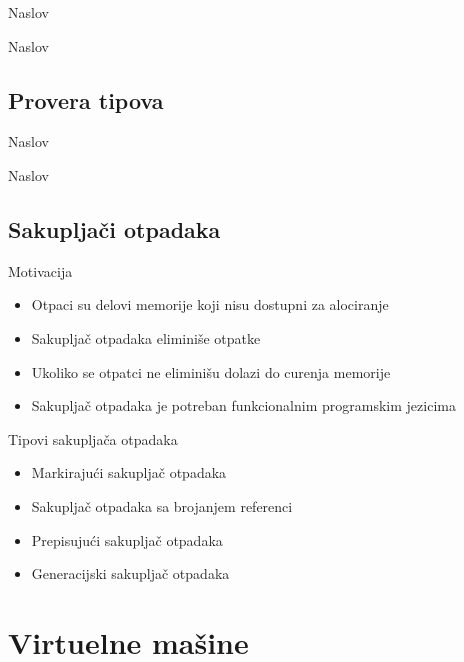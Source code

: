 \documentclass[xcolor={dvipsnames}, 11pt]{beamer}
\begin{document}
\begin{frame}{Naslov}
	
\end{frame}

\begin{frame}{Naslov}
	
\end{frame}


\subsection{Provera tipova}

\begin{frame}{Naslov}
	
\end{frame}

\begin{frame}{Naslov}
	
\end{frame}


\subsection{Sakupljači otpadaka}
\begin{frame}{Motivacija}
	\begin{itemize}
		\item Otpaci su delovi memorije koji nisu dostupni za alociranje
		\item Sakupljač otpadaka eliminiše otpatke
		\item Ukoliko se otpatci ne eliminišu dolazi do curenja memorije
		\item Sakupljač otpadaka je potreban funkcionalnim programskim jezicima
	\end{itemize}
\end{frame}

\begin{frame}{Tipovi sakupljača otpadaka}
	\begin{itemize}
		\item Markirajući sakupljač otpadaka
		\item Sakupljač otpadaka sa brojanjem referenci
		\item Prepisujući sakupljač otpadaka
		\item Generacijski sakupljač otpadaka
	\end{itemize}
\end{frame}



\section{Virtuelne mašine}
\end{document}
